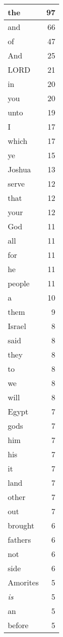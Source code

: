 \begin{center}
\begin{longtable}{l|r}
\hline \hline
\endlastfoot
the & 97 \\ \hline
and & 66 \\ \hline
of & 47 \\ \hline
And & 25 \\ \hline
LORD & 21 \\ \hline
in & 20 \\ \hline
you & 20 \\ \hline
unto & 19 \\ \hline
I & 17 \\ \hline
which & 17 \\ \hline
ye & 15 \\ \hline
Joshua & 13 \\ \hline
serve & 12 \\ \hline
that & 12 \\ \hline
your & 12 \\ \hline
God & 11 \\ \hline
all & 11 \\ \hline
for & 11 \\ \hline
he & 11 \\ \hline
people & 11 \\ \hline
a & 10 \\ \hline
them & 9 \\ \hline
Israel & 8 \\ \hline
said & 8 \\ \hline
they & 8 \\ \hline
to & 8 \\ \hline
we & 8 \\ \hline
will & 8 \\ \hline
Egypt & 7 \\ \hline
gods & 7 \\ \hline
him & 7 \\ \hline
his & 7 \\ \hline
it & 7 \\ \hline
land & 7 \\ \hline
other & 7 \\ \hline
out & 7 \\ \hline
brought & 6 \\ \hline
fathers & 6 \\ \hline
not & 6 \\ \hline
side & 6 \\ \hline
Amorites & 5 \\ \hline
\emph{is} & 5 \\ \hline
an & 5 \\ \hline
before & 5 \\ \hline

\end{longtable}
\end{center}
